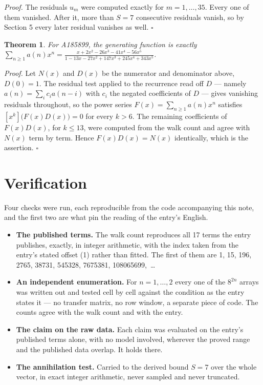 \documentclass[11pt]{article}
\newtheorem{theorem}{Theorem}
\theoremstyle{definition}
\begin{document}
{\itshape Proof.} The residuals $u_m$ were computed exactly for $m = 1,\dots,35$. Every one of them vanished. After it, more than $S = 7$ consecutive residuals vanish, so by Section 5 every later residual vanishes as well. $\square$

\begin{theorem} For A185899, the generating function is exactly $\sum_{n\ge 1} a(n)x^n = \frac{x + 2x^{2} - 26x^{3} - 41x^{4} - 56x^{5}}{1 - 13x - 27x^{2} + 147x^{3} + 245x^{4} + 343x^{5}}$.\end{theorem}

{\itshape Proof.} Let $N(x)$ and $D(x)$ be the numerator and denominator above, $D(0)=1$. The residual test applied to the recurrence read off $D$ --- namely $a(n) = \sum_i c_i a(n-i)$ with $c_i$ the negated coefficients of $D$ --- gives vanishing residuals throughout, so the power series $F(x)=\sum_{n\ge 1}a(n)x^n$ satisfies $[x^k]\bigl(F(x)D(x)\bigr) = 0$ for every $k > 6$. The remaining coefficients of $F(x)D(x)$, for $k \le 13$, were computed from the walk count and agree with $N(x)$ term by term. Hence $F(x)D(x) = N(x)$ identically, which is the assertion. $\square$

\section{Verification}

Four checks were run, each reproducible from the code accompanying this note, and the first two are what pin the reading of the entry's English.

\begin{itemize}

\item {\bfseries The published terms.} The walk count reproduces all 17 terms the entry publishes, exactly, in integer arithmetic, with the index taken from the entry's stated offset (1) rather than fitted. The first of them are 1, 15, 196, 2765, 38731, 545328, 7675381, 108065699,~\dots

\item {\bfseries An independent enumeration.} For $n = 1,\dots,2$ every one of the $8^{2n}$ arrays was written out and tested cell by cell against the condition as the entry states it --- no transfer matrix, no row window, a separate piece of code. The counts agree with the walk count and with the entry.

\item {\bfseries The claim on the raw data.} Each claim was evaluated on the entry's published terms alone, with no model involved, wherever the proved range and the published data overlap. It holds there.

\item {\bfseries The annihilation test.} Carried to the derived bound $S = 7$ over the whole vector, in exact integer arithmetic, never sampled and never truncated.

\end{itemize}
\end{document}
